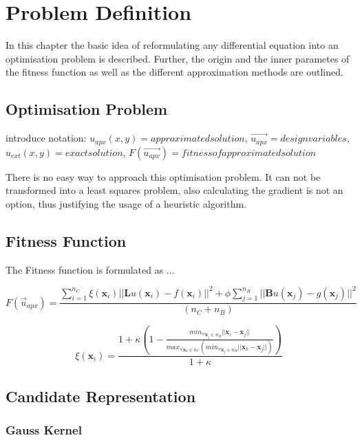 \documentclass[./\jobname.tex]{subfiles}
\begin{document}
\chapter{Problem Definition}
In this chapter the basic idea of reformulating any differential equation into an optimisation problem is described. Further, the origin and the inner parametes of the fitness function as well as the different approximation methods are outlined. 

\section{Optimisation Problem}
\label{chap:opt_problem}

introduce notation: $u_{apx}(x,y) = approximated solution$, $\vec{u_{apx}} = design variables$, $u_{ext}(x,y) = exact solution$, $F(\vec{u_{apx}}) = fitness of approximated solution$

There is no easy way to approach this optimisation problem. It can not be transformed into a least squares problem, also calculating the gradient is not an option, thus justifying the usage of a heuristic algorithm.  

\section{Fitness Function}
\label{chap:fit_func}
The Fitness function is formulated as ... 

\begin{equation}
\label{eq:fit_func}
F(\vec{u}_{apx}) = \frac{\sum_{i=1}^{n_C} \xi (\mathbf{x}_i) || \mathbf{L}u(\mathbf{x}_i) - f(\mathbf{x}_i)||^2 + \phi \sum_{j=1}^{n_B} || \mathbf{B}u(\mathbf{x}_j) - g(\mathbf{x}_j)||^2}{(n_C + n_B)}  
\end{equation}

\begin{equation}
\label{eq:nc_weight}
\xi(\mathbf{x}_i) = \frac{1 + \kappa \left(1 - \frac{min_{\forall \mathbf{x}_j\in n_B}|| \mathbf{x}_i - \mathbf{x}_j ||}{max_{\forall\mathbf{x}_k \in n_C}(min_{\forall \mathbf{x}_j \in n_B} || \mathbf{x}_k - \mathbf{x}_j ||)}\right)}{1 + \kappa}
\end{equation}


\section{Candidate Representation}
\label{chap:candidate_rep}

\subsection{Gauss Kernel}
\label{chap:gauss_kernel}
\end{document}
